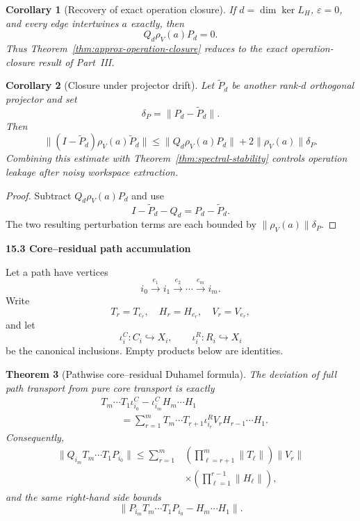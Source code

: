\documentclass[11pt,letterpaper]{article}
\newcommand{\subtopic}[1]{%
 \vspace{0.45em}
 {\bfseries\color{AccentColor} #1\par}
}
\theoremstyle{plain}
\newtheorem{theorem}{Theorem}
\newtheorem{corollary}[theorem]{Corollary}
\theoremstyle{definition}
\begin{document}
\begin{corollary}[Recovery of exact operation closure]
If \(d=\dim\ker L_H\), \(\varepsilon=0\), and every edge intertwines \(a\)
exactly, then
\[
Q_d\rho_V(a)P_d=0.
\]
Thus Theorem~\ref{thm:approx-operation-closure} reduces to the exact
operation-closure result of Part~III.
\end{corollary}

\begin{corollary}[Closure under projector drift]\label{cor:closure-drift}
Let \(\widetilde P_d\) be another rank-\(d\) orthogonal projector and set
\[
\delta_P=\|P_d-\widetilde P_d\|.
\]
Then
\[
\boxed{
\|(I-\widetilde P_d)\rho_V(a)\widetilde P_d\|
\leq
\|Q_d\rho_V(a)P_d\|
+2\|\rho_V(a)\|\delta_P.
}
\]
Combining this estimate with Theorem~\ref{thm:spectral-stability} controls
operation leakage after noisy workspace extraction.
\end{corollary}

\begin{proof}
Subtract \(Q_d\rho_V(a)P_d\) and use
\[
I-\widetilde P_d-Q_d=P_d-\widetilde P_d.
\]
The two resulting perturbation terms are each bounded by
\(\|\rho_V(a)\|\delta_P\).
\end{proof}

\subtopic{15.3 Core--residual path accumulation}

Let a path have vertices
\[
i_0\xrightarrow{e_1}i_1\xrightarrow{e_2}\cdots
\xrightarrow{e_m}i_m.
\]
Write
\[
T_r=T_{e_r},
\quad
H_r=H_{e_r},
\quad
V_r=V_{e_r},
\]
and let
\[
\iota_i^C:C_i\hookrightarrow X_i,
\qquad
\iota_i^R:R_i\hookrightarrow X_i
\]
be the canonical inclusions. Empty products below are identities.

\begin{theorem}[Pathwise core--residual Duhamel formula]\label{thm:residual-duhamel}
The deviation of full path transport from pure core transport is exactly
\[
\boxed{
\begin{aligned}
&T_m\cdots T_1\iota_{i_0}^C
-
\iota_{i_m}^C H_m\cdots H_1\\
&\qquad=
\sum_{r=1}^{m}
T_m\cdots T_{r+1}
\iota_{i_r}^R V_r
H_{r-1}\cdots H_1.
\end{aligned}
}
\]
Consequently,
\[
\boxed{
\begin{aligned}
\|Q_{i_m}T_m\cdots T_1P_{i_0}\|
\leq
\sum_{r=1}^{m}
&\left(\prod_{\ell=r+1}^{m}\|T_\ell\|\right)
\|V_r\|\\
&\times
\left(\prod_{\ell=1}^{r-1}\|H_\ell\|\right),
\end{aligned}
}
\]
and the same right-hand side bounds
\[
\|P_{i_m}T_m\cdots T_1P_{i_0}-H_m\cdots H_1\|.
\]
\end{theorem}
\end{document}
